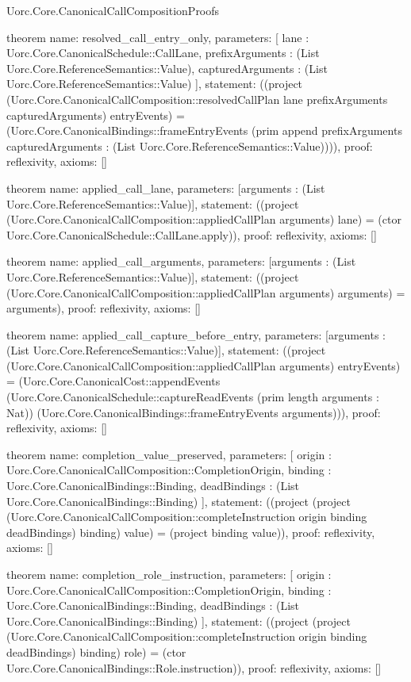 \begin{lexlean}{Uorc.Core.CanonicalCallCompositionProofs}
\begin{semanticmodule}
theorem{
  name: resolved_call_entry_only,
  parameters: [
    lane : Uorc.Core.CanonicalSchedule::CallLane,
    prefixArguments : (List Uorc.Core.ReferenceSemantics::Value),
    capturedArguments : (List Uorc.Core.ReferenceSemantics::Value)
  ],
  statement: ((project (Uorc.Core.CanonicalCallComposition::resolvedCallPlan lane prefixArguments capturedArguments) entryEvents) = (Uorc.Core.CanonicalBindings::frameEntryEvents (prim append prefixArguments capturedArguments : (List Uorc.Core.ReferenceSemantics::Value)))),
  proof: reflexivity{},
  axioms: []
}

theorem{
  name: applied_call_lane,
  parameters: [arguments : (List Uorc.Core.ReferenceSemantics::Value)],
  statement: ((project (Uorc.Core.CanonicalCallComposition::appliedCallPlan arguments) lane) = (ctor Uorc.Core.CanonicalSchedule::CallLane.apply)),
  proof: reflexivity{},
  axioms: []
}

theorem{
  name: applied_call_arguments,
  parameters: [arguments : (List Uorc.Core.ReferenceSemantics::Value)],
  statement: ((project (Uorc.Core.CanonicalCallComposition::appliedCallPlan arguments) arguments) = arguments),
  proof: reflexivity{},
  axioms: []
}

theorem{
  name: applied_call_capture_before_entry,
  parameters: [arguments : (List Uorc.Core.ReferenceSemantics::Value)],
  statement: ((project (Uorc.Core.CanonicalCallComposition::appliedCallPlan arguments) entryEvents) = (Uorc.Core.CanonicalCost::appendEvents (Uorc.Core.CanonicalSchedule::captureReadEvents (prim length arguments : Nat)) (Uorc.Core.CanonicalBindings::frameEntryEvents arguments))),
  proof: reflexivity{},
  axioms: []
}

theorem{
  name: completion_value_preserved,
  parameters: [
    origin : Uorc.Core.CanonicalCallComposition::CompletionOrigin,
    binding : Uorc.Core.CanonicalBindings::Binding,
    deadBindings : (List Uorc.Core.CanonicalBindings::Binding)
  ],
  statement: ((project (project (Uorc.Core.CanonicalCallComposition::completeInstruction origin binding deadBindings) binding) value) = (project binding value)),
  proof: reflexivity{},
  axioms: []
}

theorem{
  name: completion_role_instruction,
  parameters: [
    origin : Uorc.Core.CanonicalCallComposition::CompletionOrigin,
    binding : Uorc.Core.CanonicalBindings::Binding,
    deadBindings : (List Uorc.Core.CanonicalBindings::Binding)
  ],
  statement: ((project (project (Uorc.Core.CanonicalCallComposition::completeInstruction origin binding deadBindings) binding) role) = (ctor Uorc.Core.CanonicalBindings::Role.instruction)),
  proof: reflexivity{},
  axioms: []
}


\end{semanticmodule}
\end{lexlean}
